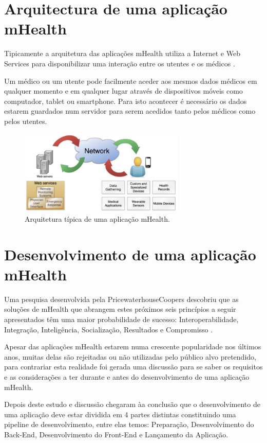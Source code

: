\documentclass[11pt,twoside,a4paper]{report}
\begin{document}
\section{Arquitectura de uma aplica\c c\~ao mHealth}

Tipicamente a arquitetura das aplica\c c\~oes mHealth utiliza a Internet e Web Services para disponibilizar uma intera\c c\~ao entre os utentes e os m\'edicos \cite{mhealth}.
\par
Um m\'edico ou um utente pode facilmente aceder aos mesmos dados m\'edicos em qualquer momento e em qualquer lugar atrav\'es de dispositivos m\'oveis como computador, tablet ou smartphone. Para isto acontecer é necessário os dados estarem guardados num servidor para serem acedidos tanto pelos médicos como pelos utentes.

\begin{figure}[H]
  \centering
  \includegraphics[width=0.7\textwidth]{imgs/mHealthArch.png}
  \caption[Arquitetura t\'ipica de uma  aplica\c c\~ao mHealth]{Arquitetura t\'ipica de uma  aplica\c c\~ao mHealth. \cite{mhealth}}
  
  \label{f:mhealtharch}
\end{figure}


\section{Desenvolvimento de uma aplica\c c\~ao mHealth}

Uma pesquisa desenvolvida pela PricewaterhouseCoopers descobriu que as solu\c c\~oes de mHealth que abrangem estes pr\'oximos seis princ\'ipios a seguir apresentados t\^em uma maior probabilidade de sucesso: Interoperabilidade, Integra\c c\~ao, Intelig\^encia, Socializa\c c\~ao, Resultados e Compromisso \cite{mhealthinsights}.
\par
Apesar das aplica\c c\~oes mHealth estarem numa crescente popularidade nos \'ultimos anos, muitas delas s\~ao rejeitadas ou n\~ao utilizadas pelo p\'ublico alvo pretendido, para contrariar esta realidade foi gerada uma discuss\~ao para se saber os requisitos e as considera\c c\~oes a ter durante e antes do desenvolvimento de uma aplica\c c\~ao mHealth.
\par
Depois deste estudo e discuss\~ao chegaram \`aa conclus\~ao que o desenvolvimento de uma aplica\c c\~ao deve estar dividida em 4 partes distintas constituindo uma pipeline de desenvolvimento, entre elas temos:  Prepara\c c\~ao, Desenvolvimento do Back-End, Desenvolvimento do Front-End e Lan\c camento da Aplica\c c\~ao\cite{mhealth-pipeline}.
\end{document}
